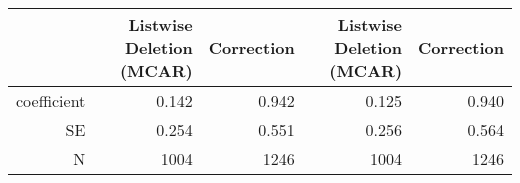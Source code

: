 \begin{table}[ht]
\centering
\begin{tabular}{rrrrr}
  \hline
 & Listwise Deletion (MCAR) & Correction & Listwise Deletion (MCAR) & Correction \\ 
  \hline
coefficient & 0.142 & 0.942 & 0.125 & 0.940 \\ 
  SE & 0.254 & 0.551 & 0.256 & 0.564 \\ 
  N & 1004 & 1246 & 1004 & 1246 \\ 
   \hline
\end{tabular}
\end{table}
